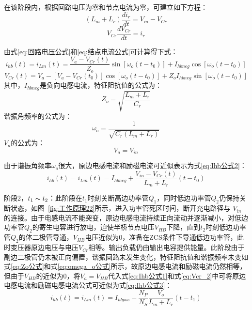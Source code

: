 在该阶段内，根据回路电压为零和节点电流为零，可建立如下方程：
\begin{equation}
    \label{eq:回路电压公式}
    (L_m + L_r)\frac{di_r}{dt} = V_{in} - V_{Cr}  
\end{equation}
\begin{equation}
    \label{eq:结点电流公式}
    V_{Cr}\frac{dV_{Cr}}{dt} = i_r 
\end{equation}

由式\eqref{eq:回路电压公式}和\eqref{eq:结点电流公式}可计算得下式：
\begin{equation}
    \label{eq:Ihb公式1}
    i_{hb}(t) = i_{Lm}(t) = \frac{V_{a}-V_{Cr}(t)}{Z_o}\sin[\omega_o(t-t_0)] + I_{hbneg}\cos[\omega_o(t-t_0)]  
\end{equation}
\begin{equation}
    \label{eq:Vcr_2}
    V_{Cr}(t) =V_{a}-[V_{a}-V_{Cr}(t_0)]\cos[\omega_o(t-t_0)] + {Z_o} I_{hbneg} \sin[\omega_o(t-t_0)]
\end{equation}
其中，$I_{hbneg}$是负向电感电流，特征阻抗值的公式为：
\begin{equation}
    \label{eq:Zo公式}
    Z_o=\sqrt{\frac{L_m+L_r}{C_r}}  
\end{equation}
谐振角频率的公式为：
\begin{equation}
    \label{eq:omega_o公式}
    \omega_o=\frac{1}{\sqrt{C_r(L_m+L_r)}}
\end{equation}
$V_{a}$的公式为：
\begin{equation}
    \label{eq:Vhb公式1}
    V_{a}=V_{in}
\end{equation}

由于谐振角频率$\omega_o$很大，原边电感电流和励磁电流可近似表示为式\eqref{eq:Ihb公式2}：
\begin{equation}
    \label{eq:Ihb公式2}
    i_{hb}(t) = i_{Lm}(t) = I_{hbneg} + \frac{V_{in}-V_{Cr}(t)}{L_m + L_r}(t-t_0)
\end{equation}


                
阶段2，$t_1 \thicksim t_2$：此阶段在$t_1$时刻关断高边功率管$Q_1$，同时低边功率管$Q_2$仍保持关断状态，如图~\ref{fig:工作原理22}所示，进入功率管死区时间，断开充电路径与 $V_{in}$ 的连接。由于电感电流不能突变，原边电感电流持续正向流动并逐渐减小，对低边功率管$Q_2$的寄生电容进行放电，迫使半桥节点电压$V_{HB}$下降，直到$t_2$时刻低边功率管$Q_2$的体二极管导通，$V_{HB}$电压近似为0，准备在ZCS条件下导通低边功率管，此时变压器原边电压与电压$V_{Cr}$相等。输出负载仍由输出电容提供能量。此阶段由于副边二极管仍未被正向偏置，谐振回路未发生变化，特征阻抗值和谐振频率未变如式\eqref{eq:Zo公式}和式\eqref{eq:omega_o公式}所示，故原边电感电流和励磁电流仍然相等，但由于$V_{HB}$的近似为0，将$V_a=V_{HB}$代入式\eqref{eq:Ihb公式1}和式\eqref{eq:Vcr_2}中可将原边电感电流和励磁电感电流公式可近似为式\eqref{eq:Ihb公式3}：
\begin{equation}
    \label{eq:Ihb公式3}
    i_{hb}(t) = i_{Lm}(t) = I_{hbpos} - \frac{N_P}{N_S} \frac{V_o}{L_m + L_r}(t-t_1)
\end{equation}

